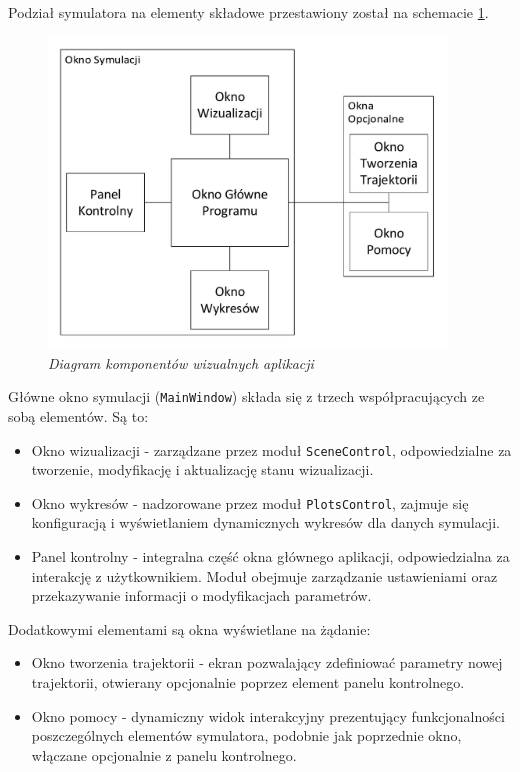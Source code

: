\documentclass[12pt, twoside, openany]{report}
\theoremstyle{definition}
\begin{document}
Podział symulatora na elementy składowe przestawiony został na schemacie \ref{SystemVisual}.

\begin{figure}[H]
	\centering
		\includegraphics[width = 300pt]{SystemVisual} 
		\caption{\textit{Diagram komponentów wizualnych aplikacji}}
		\label{SystemVisual}
\end{figure}

Główne okno symulacji (\texttt{MainWindow}) składa się z trzech współpracujących ze sobą elementów. Są to:
\begin{itemize}
\item Okno wizualizacji - zarządzane przez moduł \texttt{SceneControl}, odpowiedzialne za tworzenie, modyfikację i aktualizację stanu wizualizacji.
\item Okno wykresów - nadzorowane przez moduł \texttt{PlotsControl}, zajmuje się konfiguracją i wyświetlaniem dynamicznych wykresów dla danych symulacji. 
\item Panel kontrolny - integralna część okna głównego aplikacji, odpowiedzialna za interakcję z użytkownikiem. Moduł obejmuje zarządzanie ustawieniami oraz przekazywanie informacji o modyfikacjach parametrów.
\end{itemize}

Dodatkowymi elementami są okna wyświetlane na żądanie:
\begin{itemize}
\item Okno tworzenia trajektorii - ekran pozwalający zdefiniować parametry nowej trajektorii, otwierany opcjonalnie poprzez element panelu kontrolnego.
\item Okno pomocy - dynamiczny widok interakcyjny prezentujący funkcjonalności poszczególnych elementów symulatora, podobnie jak poprzednie okno, włączane opcjonalnie z panelu kontrolnego.
\end{itemize}
\end{document}
